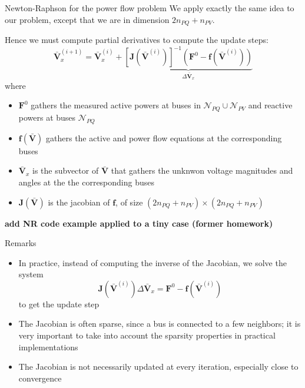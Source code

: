 \begin{frame}[allowframebreaks]{Newton-Raphson for the power flow problem}
    We apply exactly the same idea to our problem, except that we are in dimension $2 n_{PQ} + n_{PV}$.
    
    Hence we must compute partial derivatives to compute the update steps:
    $$\mathbf{\bar{V}}^{(i+1)}_x = \mathbf{\bar{V}}^{(i)}_x + \underbrace{\left[\mathbf{J}(\mathbf{\bar{V}}^{(i)})\right]^{-1} (\mathbf{F}^0-\mathbf{f}(\mathbf{\bar{V}}^{(i)}))}_{\Delta \mathbf{\bar{V}}_x}$$
    where
    \begin{itemize}
        \item $\mathbf{F}^0$ gathers the measured active powers at buses in $\mathcal{N}_{PQ} \cup \mathcal{N}_{PV}$ and reactive powers at buses $\mathcal{N}_{PQ}$
        \item $\mathbf{f}(\mathbf{\bar{V}})$ gathers the active and power flow equations at the corresponding buses
        \item $\mathbf{\bar{V}}_x$ is the subvector of $\mathbf{\bar{V}}$ that gathers the unknwon voltage magnitudes and angles at the the corresponding buses
        \item $\mathbf{J}(\mathbf{\bar{V}})$ is the jacobian of $\mathbf{f}$, of size $(2 n_{PQ} + n_{PV}) \times (2 n_{PQ} + n_{PV})$
    \end{itemize}

        \textbf{add NR code example applied to a tiny case (former homework)}

\end{frame}

\begin{frame}{Remarks}
    \begin{itemize}
        \item In practice, instead of computing the inverse of the Jacobian, we solve the system
        $$\mathbf{J}(\mathbf{\bar{V}}^{(i)}) \Delta \mathbf{\bar{V}}_x = \mathbf{F}^0-\mathbf{f}(\mathbf{\bar{V}}^{(i)})$$
        to get the update step
        \item The Jacobian is often sparse, since a bus is connected to a few neighbors; it is very important to take into account the sparsity properties in practical implementations
        \item The Jacobian is not necessarily updated at every iteration, especially close to convergence
    \end{itemize}
\end{frame}


